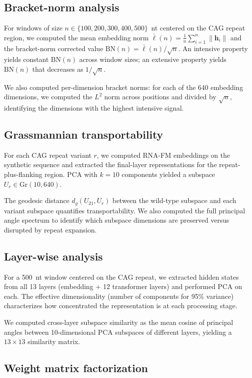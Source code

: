\documentclass[11pt]{article}
\newcommand{\Gr}{\mathrm{Gr}}
\newcommand{\BN}{\mathrm{BN}}
\begin{document}
\subsection{Bracket-norm analysis}

For windows of size $n \in \{100, 200, 300, 400, 500\}$~nt centered on
the CAG repeat region, we computed the mean embedding norm
$\bar{\ell}(n) = \frac{1}{n} \sum_{i=1}^{n} \|\mathbf{h}_i\|$
and the bracket-norm corrected value $\BN(n) = \bar{\ell}(n) / \sqrt{n}$.
%
An intensive property yields constant $\BN(n)$ across window sizes;
an extensive property yields $\BN(n)$ that decreases as $1/\sqrt{n}$.

We also computed per-dimension bracket norms: for each of the 640
embedding dimensions, we computed the $L^2$ norm across positions and
divided by $\sqrt{n}$, identifying the dimensions with the highest
intensive signal.

\subsection{Grassmannian transportability}

For each CAG repeat variant $r$, we computed RNA-FM embeddings on the
synthetic sequence and extracted the final-layer representations for
the repeat-plus-flanking region. PCA with $k = 10$ components yielded
a subspace $U_r \in \Gr(10, 640)$.

The geodesic distance $d_g(U_{21}, U_r)$ between the wild-type
subspace and each variant subspace quantifies transportability.
We also computed the full principal angle spectrum to identify which
subspace dimensions are preserved versus disrupted by repeat expansion.

\subsection{Layer-wise analysis}

For a 500~nt window centered on the CAG repeat, we extracted hidden
states from all 13 layers (embedding + 12 transformer layers) and
performed PCA on each. The effective dimensionality (number of
components for 95\% variance) characterizes how concentrated the
representation is at each processing stage.

We computed cross-layer subspace similarity as the mean cosine of
principal angles between 10-dimensional PCA subspaces of different
layers, yielding a $13 \times 13$ similarity matrix.

\subsection{Weight matrix factorization}
\end{document}
